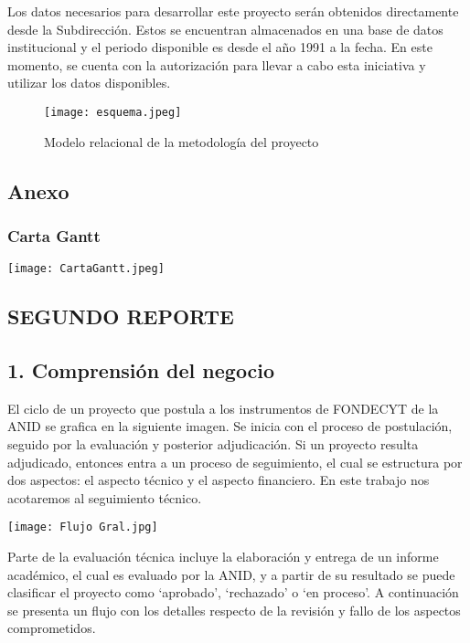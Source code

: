 \documentclass[
]{article}
\begin{document}
\vspace{3mm}

\noindent Los datos necesarios para desarrollar este proyecto serán
obtenidos directamente desde la Subdirección. Estos se encuentran
almacenados en una base de datos institucional y el periodo disponible
es desde el año 1991 a la fecha. En este momento, se cuenta con la
autorización para llevar a cabo esta iniciativa y utilizar los datos
disponibles.

\begin{figure}[H]
    \centering
    \texttt{[image: esquema.jpeg]}
    \caption{Modelo relacional de la metodología del proyecto}
    \label{fig:my_label}
\end{figure}

\hypertarget{anexo}{%
\subsection{Anexo}\label{anexo}}

\hypertarget{carta-gantt}{%
\subsubsection{Carta Gantt}\label{carta-gantt}}

\texttt{[image: CartaGantt.jpeg]}

\hypertarget{segundo-reporte}{%
\subsection{SEGUNDO REPORTE}\label{segundo-reporte}}

\hypertarget{comprensiuxf3n-del-negocio}{%
\subsection{1. Comprensión del
negocio}\label{comprensiuxf3n-del-negocio}}

El ciclo de un proyecto que postula a los instrumentos de FONDECYT de la
ANID se grafica en la siguiente imagen. Se inicia con el proceso de
postulación, seguido por la evaluación y posterior adjudicación. Si un
proyecto resulta adjudicado, entonces entra a un proceso de seguimiento,
el cual se estructura por dos aspectos: el aspecto técnico y el aspecto
financiero. En este trabajo nos acotaremos al seguimiento técnico.

\texttt{[image: Flujo Gral.jpg]}

Parte de la evaluación técnica incluye la elaboración y entrega de un
informe académico, el cual es evaluado por la ANID, y a partir de su
resultado se puede clasificar el proyecto como `aprobado', `rechazado' o
`en proceso'. A continuación se presenta un flujo con los detalles
respecto de la revisión y fallo de los aspectos comprometidos.
\end{document}
